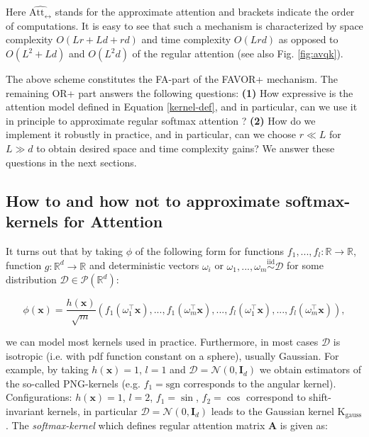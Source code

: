  
Here $\widehat{\mathrm{Att}_\leftrightarrow}$ stands for the approximate attention and brackets indicate the order of computations. It is easy to see that such a mechanism is characterized by space complexity $O(Lr + Ld + rd)$ and time complexity $O(Lrd)$ as opposed to $O(L^{2}+Ld)$ and $O(L^{2}d)$ of the regular attention (see also Fig. \ref{fig:avqk}).

The above scheme constitutes the FA-part of the FAVOR+ mechanism. The remaining OR+ part answers the following questions: \textbf{(1)} How expressive is the attention model defined in Equation \ref{kernel-def}, and in particular, can we use it in principle to approximate regular softmax attention ? \textbf{(2)} How do we implement it robustly in practice, and in particular, can we choose $r \ll L$ for $L \gg d$ to obtain desired space and time complexity gains? We answer these questions in the next sections.

\subsection{How to and how not to approximate softmax-kernels for Attention}
\label{howto}

It turns out that by taking $\phi$ of the following form for functions $f_{1},...,f_{l}:\mathbb{R} \rightarrow \mathbb{R}$,
function $g:\mathbb{R}^{d} \rightarrow \mathbb{R}$ and deterministic vectors $\omega_{i}$ or $\omega_{1},...,\omega_{m} \overset{\mathrm{iid}}{\sim} \mathcal{D}$ for some distribution $\mathcal{D} \in \mathcal{P}(\mathbb{R}^{d})$:

\begin{equation} \label{eq:feature}
\phi(\mathbf{x}) = \frac{h(\mathbf{x})}{\sqrt{m}}
(f_{1}(\omega_{1}^{\top}\mathbf{x}),...,f_{1}(\omega_{m}^{\top}\mathbf{x}),...,f_{l}(\omega_{1}^{\top}\mathbf{x}),...,f_{l}(\omega_{m}^{\top}\mathbf{x})),    
\end{equation}

we can model most kernels used in practice. Furthermore, in most cases $\mathcal{D}$ is isotropic (i.e. with pdf function constant on a sphere), usually Gaussian. For example, by taking $h(\mathbf{x})=1$, $l=1$ and $\mathcal{D}=\mathcal{N}(0,\mathbf{I}_{d})$ we obtain estimators of the so-called PNG-kernels \citep{unreas} (e.g. $f_{1} = \mathrm{sgn}$ corresponds to the angular kernel). Configurations: $h(\mathbf{x})=1$, $l=2$, $f_{1}=\sin$, $f_{2}=\cos$ correspond to shift-invariant kernels, in particular $\mathcal{D}=\mathcal{N}(0, \mathbf{I}_{d})$ leads to the Gaussian kernel $\mathrm{K}_{\mathrm{gauss}}$ \citep{fourierapprox}. The \textit{softmax-kernel} which defines regular attention matrix $\mathbf{A}$ is given as:

